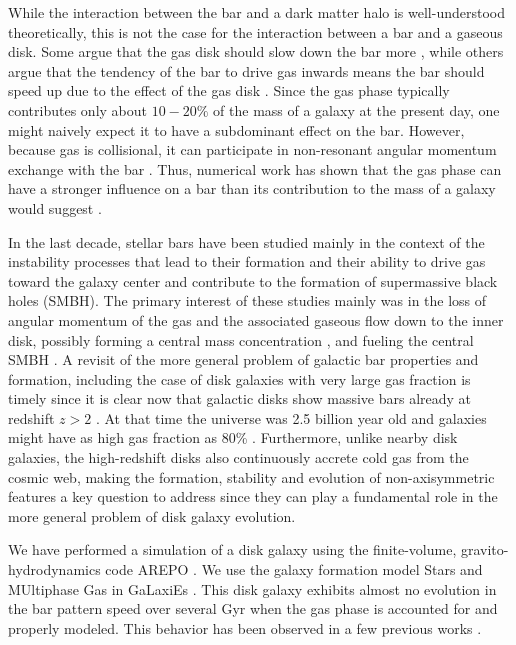 \documentclass[twocolumn,linenumbers]{aastex631}
\newcommand{\AREPO}{\textsc{AREPO}}
\newcommand{\SMUGGLE}{SMUGGLE}
\begin{document}
While the interaction between the bar and a dark matter halo is well-understood
theoretically, this is not the case for the interaction between a bar and a
gaseous disk. Some argue that the gas disk should slow down the bar more
\citep{2003MNRAS.341.1179A}, while others argue that the tendency of the bar to
drive gas inwards means the bar should speed up due to the effect of the gas
disk \citep{2013MNRAS.429.1949A, 2014MNRAS.438L..81A}. Since the gas phase
typically contributes only about $10-20\%$ of the mass of a galaxy at the
present day, one might naively expect it to have a subdominant effect on the
bar. However, because gas is collisional, it can participate in non-resonant
angular momentum exchange with the bar \citep{2011MNRAS.415.1027H}. Thus,
numerical work has shown that the gas phase can have a stronger influence on a
bar than its contribution to the mass of a galaxy would suggest
\citep{2010ApJ...719.1470V, 2013MNRAS.429.1949A}.


In the last decade, stellar bars have been studied mainly in the
context of the instability processes that lead to their formation and their
ability to drive gas toward the galaxy center and contribute to the formation of
supermassive black holes (SMBH). The primary interest of these studies mainly
was in the loss of angular momentum of the gas and the associated  gaseous flow
down to the inner disk, possibly forming a central mass concentration
\citep{2010ApJ...719.1470V}, and fueling the central SMBH \citep[e.g.][]{1989Natur.338...45S, 1990Natur.345..679S}. A revisit of the more general problem of
galactic bar properties and formation, including the case of disk galaxies with
very large gas fraction is timely since it is clear now that galactic disks show
massive bars already at redshift $z>2$ \citep{2022arXiv221008658G}. At
that time the universe was 2.5 billion year old and galaxies might have as high
gas fraction as 80\% \citep{2020ARAA..58..157T}. Furthermore, unlike
nearby disk galaxies, the high-redshift disks also continuously accrete cold gas
from the cosmic web, making the formation, stability and evolution of
non-axisymmetric features a key question to address since they can play a
fundamental role in the more general problem of disk galaxy evolution.



We have performed a simulation of a disk galaxy using the finite-volume,
gravito-hydrodynamics code \AREPO{} \citep{2010MNRAS.401..791S}. We use the
galaxy formation model Stars and MUltiphase Gas in GaLaxiEs
\citep[\SMUGGLE{};][]{2019MNRAS.489.4233M}. This disk galaxy exhibits almost no
evolution in the bar pattern speed over several Gyr when the gas phase is
accounted for and properly modeled. This behavior has been observed in a few
previous works \citep{1993AA...268...65F, 2007ApJ...666..189B,
2009ApJ...707..218V, 2010ApJ...719.1470V, 2014MNRAS.438L..81A}. 
\end{document}
